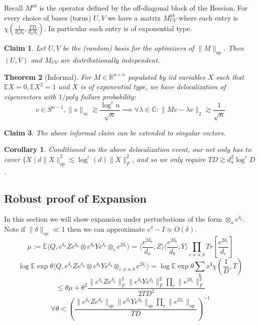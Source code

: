 \documentclass{article}
\newtheorem{theorem}{Theorem}
\newtheorem{corollary}{Corollary}
\newtheorem{claim}[theorem]{Claim}
\newcommand{\R}{{\mathbb{R}}}
\newcommand{\C}{{\mathbb{C}}}
\renewcommand{\vec}{\bm}
\newcommand{\E}{\mathbb{E}}
\begin{document}
Recall $M^{ab}$ is the operator defined by the off-diagonal block of the Hessian. For every choice of bases (torus) $U,V$ we have a matrix $M^{ab}_{UV}$ where each entry is $\chi(\frac{1}{d_{a}d_{b}}, \frac{TD}{d_{a}d_{b}})$. In particular each entry is of exponential type. 

\begin{claim}
Let $U,V$ be the (random) basis for the optimizers of $\|M\|_{op}$. Then $(U,V)$ and $M_{UV}$ are distributionally independent. 
\end{claim}

\begin{theorem} [Informal]
For $M \in \R^{n \times n}$ populated by iid variables $X$ such that $\E X = 0, \E X^{2} = 1$ and $X$ is of exponential type, we have delocalization of eigenvectors with $1/poly$ failure probability:
\[ v \in S^{n-1}, \|v\|_{\infty} \gtrsim \frac{\log^{c} n}{\sqrt{n}} \implies \forall \lambda \in \C: \|Mv - \lambda v\|_{2} \gtrsim \frac{1}{\sqrt{n}}   \]
\end{theorem}


\begin{claim}
The above informal claim can be extended to singular vectors. 
\end{claim}

\begin{corollary}
Conditioned on the above delocalization event, our net only has to cover $\{X \mid d \|X\|_{op}^{2} \lesssim \log^{c}(d) \|X\|_{F}^{2}$, and so we only require $TD \gtrsim d_{a}^{2} \log^{c} D$.
\end{corollary}


\subsection{Robust proof of Expansion}
In this section we will show expansion under perturbations of the form $\otimes_{a} e^{\delta_{a}}$. Note if $\|\delta\|_{op} \ll 1$ then we can approximate $e^{\delta} - I \approx O(\delta)$. 
\[ \mu := \E \langle Q, e^{\delta_{a}} Z e^{\delta_{a}} \otimes e^{\delta_{b}} Y e^{\delta_{b}} \otimes_{c} e^{2\delta_{c}} \rangle = \langle \frac{e^{2\delta_{a}}}{d_{a}} , Z \rangle \langle \frac{e^{2\delta_{b}}}{d_{b}}, Y \rangle \prod_{c \neq a,b} Tr[\frac{e^{2\delta_{c}}}{d_{c}} ]  \]
\[ \log \E \exp \theta \langle Q, e^{\delta_{a}} Z e^{\delta_{a}} \otimes e^{\delta_{b}} Y e^{\delta_{b}} \otimes_{c \neq a,b} e^{2\delta_{c}} \rangle = \log \E \exp \theta \sum_{\vec{i}} x^{\vec{i}} \chi(\frac{1}{D},T)   \]
\[ \leq \theta \mu + \theta^{2} \frac{\|e^{\delta_{a}} Z e^{\delta_{a}}\|_{F}^{2} \|e^{\delta_{b}} Y e^{\delta_{b}}\|_{F}^{2} \prod_{c} \|e^{2\delta_{c}}\|_{F}^{2}}{2 TD^{2}} \]
\[ \forall \theta < \left( \frac{\|e^{\delta_{a}} Z e^{\delta_{a}}\|_{op} \|e^{\delta_{b}} Y e^{\delta_{b}}\|_{op} \prod_{c} \|e^{2\delta_{c}}\|_{op}}{TD} \right)^{-1}    \]
\end{document}
